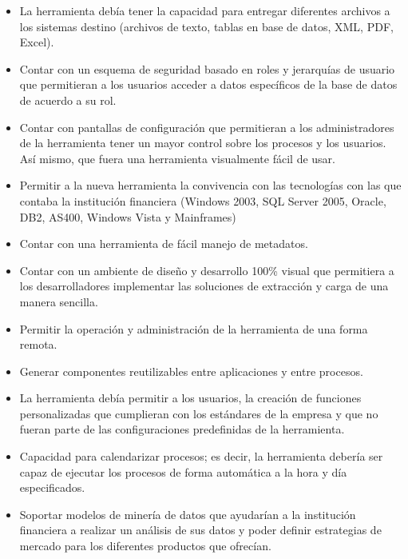 \begin{itemize}
\item La herramienta debía tener la capacidad para entregar diferentes archivos
  a los sistemas destino (archivos de texto, tablas en base de datos, XML, PDF,
  Excel).

\item Contar con un esquema de seguridad basado en roles y jerarquías de usuario
  que permitieran a los usuarios acceder a datos específicos de la base de datos
  de acuerdo a su rol.

\item Contar con pantallas de configuración que permitieran a los
  administradores de la herramienta tener un mayor control sobre los procesos y
  los usuarios. Así mismo, que fuera una herramienta visualmente fácil de usar.

\item Permitir a la nueva herramienta la convivencia con las tecnologías con las
  que contaba la institución financiera (Windows 2003, SQL Server 2005, Oracle,
  DB2, AS400, Windows Vista y Mainframes)

\item Contar con una herramienta de fácil manejo de metadatos.

\item Contar con un ambiente de diseño y desarrollo 100\% visual que permitiera
  a los desarrolladores implementar las soluciones de extracción y carga de una
  manera sencilla.

\item Permitir la operación y administración de la herramienta de una forma
  remota.

\item Generar componentes reutilizables entre aplicaciones y entre procesos.

\item La herramienta debía permitir a los usuarios, la creación de funciones
  personalizadas que cumplieran con los estándares de la empresa y que no fueran
  parte de las configuraciones predefinidas de la herramienta.

\item Capacidad para calendarizar procesos; es decir, la herramienta debería ser
  capaz de ejecutar los procesos de forma automática a la hora y día
  especificados.

\item Soportar modelos de minería de datos que ayudarían a la institución
  financiera a realizar un análisis de sus datos y poder definir estrategias de
  mercado para los diferentes productos que ofrecían.


\end{itemize}
